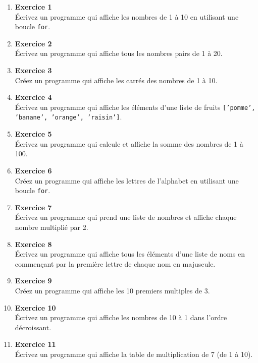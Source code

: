 \documentclass{article}
\begin{document}
\begin{enumerate}

    \item \textbf{Exercice 1} \\
    Écrivez un programme qui affiche les nombres de 1 à 10 en utilisant une boucle \texttt{for}.

    \item \textbf{Exercice 2} \\
    Écrivez un programme qui affiche tous les nombres pairs de 1 à 20.

    \item \textbf{Exercice 3} \\
    Créez un programme qui affiche les carrés des nombres de 1 à 10.

    \item \textbf{Exercice 4} \\
    Écrivez un programme qui affiche les éléments d'une liste de fruits \texttt{['pomme', 'banane', 'orange', 'raisin']}.

    \item \textbf{Exercice 5} \\
    Écrivez un programme qui calcule et affiche la somme des nombres de 1 à 100.

    \item \textbf{Exercice 6} \\
    Créez un programme qui affiche les lettres de l'alphabet en utilisant une boucle \texttt{for}.

    \item \textbf{Exercice 7} \\
    Écrivez un programme qui prend une liste de nombres et affiche chaque nombre multiplié par 2.

    \item \textbf{Exercice 8} \\
    Écrivez un programme qui affiche tous les éléments d'une liste de noms en commençant par la première lettre de chaque nom en majuscule.

    \item \textbf{Exercice 9} \\
    Créez un programme qui affiche les 10 premiers multiples de 3.

    \item \textbf{Exercice 10} \\
    Écrivez un programme qui affiche les nombres de 10 à 1 dans l'ordre décroissant.

    \item \textbf{Exercice 11} \\
    Écrivez un programme qui affiche la table de multiplication de 7 (de 1 à 10).


\end{enumerate}
\end{document}
